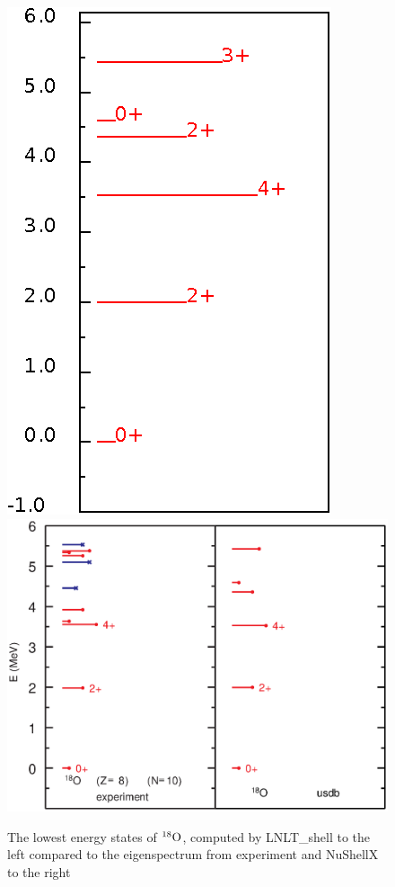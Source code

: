 \begin{figure}[h!]
\includegraphics{ox18.eps}
\includegraphics[scale=0.56,trim=0cm 2.3cm 0cm 0cm]{o_18b.eps}
\caption{The lowest energy states of $^{18}\rm{O}$, computed by LNLT\_shell to the left compared to the eigenspectrum from experiment and NuShellX to the right}
\label{fig:ox18eig}
\end{figure}

